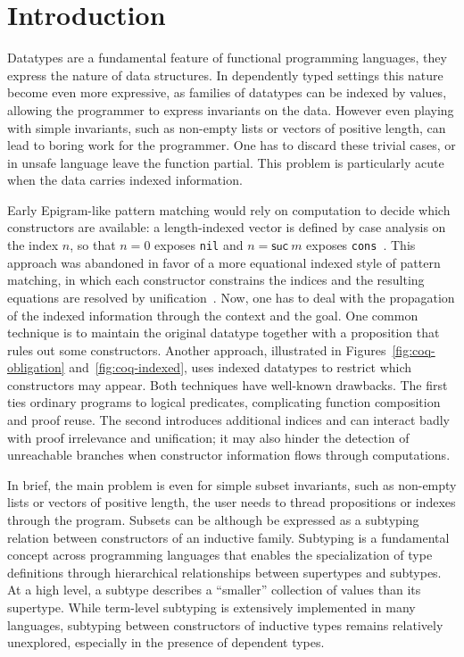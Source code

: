 \documentclass[a4paper, anonymous, UKenglish,cleveref, autoref, thm-restate]{lipics-v2021}
\begin{document}
\section{Introduction}
Datatypes are a fundamental feature of functional programming languages, they express the nature of data structures.
In dependently typed settings this nature become even more expressive, as families of datatypes can be indexed by values, allowing the programmer to express invariants on the data. 
However even playing with simple invariants, such as non-empty lists or vectors of positive length, can lead to boring work for the programmer.
One has to discard these trivial cases, or in unsafe language leave the function partial. This problem is particularly acute when the data carries indexed information.

Early Epigram-like pattern matching would rely on computation to decide which constructors are available: a length-indexed vector is defined by case analysis on the index $n$, so that $n = 0$ exposes \texttt{nil} and $n = \mathsf{suc}\ m$ exposes \texttt{cons}~\cite{mcbride2004view,altenkirch2009indexed,dagand2012elaborating}.
This approach was abandoned in favor of a more equational indexed style of pattern matching, in which each constructor constrains the indices and the resulting equations are resolved by unification~\cite{coquand1992pattern,sozeau2010equations}.
Now, one has to deal with the propagation of the indexed information through the context and the goal.
One common technique is to maintain the original datatype together with a proposition that rules out some constructors. Another approach, illustrated in Figures~\ref{fig:coq-obligation} and~\ref{fig:coq-indexed}, uses indexed datatypes to restrict which constructors may appear. 
Both techniques have well-known drawbacks. The first ties ordinary programs to logical predicates, complicating function composition and proof reuse. 
The second introduces additional indices and can interact badly with proof irrelevance and unification; it may also hinder the detection of unreachable branches when constructor information flows through computations.

In brief, the main problem is even for simple subset invariants, such as non-empty lists or vectors of positive length, the user needs to thread propositions or indexes through the program.
Subsets can be although be expressed as a subtyping relation between constructors of an inductive family.
Subtyping is a fundamental concept across programming languages that enables the specialization of type definitions through hierarchical relationships between supertypes and subtypes.
At a high level, a subtype describes a ``smaller'' collection of values than its supertype. 
While term-level subtyping is extensively implemented in many languages, subtyping between constructors of inductive types remains relatively unexplored, especially in the presence of dependent types.
\end{document}

